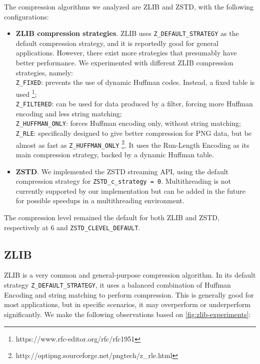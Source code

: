 \documentclass[sigconf,nonacm]{acmart}
\begin{document}
The compression algorithms we analyzed are ZLIB and ZSTD, with the following configurations:

\begin{itemize}
  \item \textbf{ZLIB compression strategies}. ZLIB uses \texttt{Z\_DEFAULT\_STRATEGY} as the default compression strategy, and it is reportedly good for general applications.
        However, there exist more strategies that presumably have better performance. %
        We experimented with different ZLIB compression strategies, namely: \\
        \texttt{Z\_FIXED}: prevents the use of dynamic Huffman codes. Instead, a fixed table is used \footnote{https://www.rfc-editor.org/rfc/rfc1951}; \\
        \texttt{Z\_FILTERED}: can be used for data produced by a filter, forcing more Huffman encoding and less string matching; \\
        \texttt{Z\_HUFFMAN\_ONLY}: forces Huffman encoding only, without string matching; \\
        \texttt{Z\_RLE}: specifically designed to give better compression for PNG data, but be almost as fast as \texttt{Z\_HUFFMAN\_ONLY} \footnote{http://optipng.sourceforge.net/pngtech/z\_rle.html}.
        It uses the Run-Length Encoding \cite{robinson1967results} as its main compression strategy, backed by a dynamic Huffman table.
  \item \textbf{ZSTD}. We implemented the ZSTD streaming API, using the default compression strategy for \texttt{ZSTD\_c\_strategy = 0}.
        Multithreading is not currently supported by our implementation but can be added in the future for possible speedups in a multithreading environment.
\end{itemize}

The compression level remained the default for both ZLIB and ZSTD, respectively at 6 and \texttt{ZSTD\_CLEVEL\_DEFAULT}.
\subsection{ZLIB}
ZLIB is a very common and general-purpose compression algorithm.
In its default strategy \texttt{Z\_DEFAULT\_STRATEGY}, it uses a balanced combination of Huffman Encoding and string matching to perform compression.
This is generally good for most applications, but in specific scenarios, it may overperform or underperform significantly.
We make the following observations based on \autoref{fig:zlib-experiments}:
\end{document}
